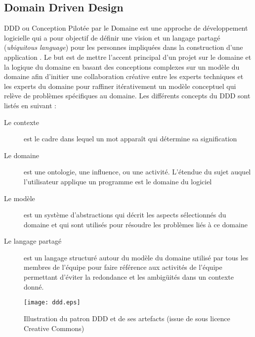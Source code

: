 \subsection{Domain Driven Design}
	
	\gls{DDD} ou Conception Pilotée par le Domaine est une 
	approche de 
	développement logicielle qui a pour objectif de définir une vision et un 
	langage partagé (\textit{ubiquitous language}) pour les personnes 
	impliquées dans la construction d'une application \cite{Evans2003}.
	Le but est de mettre l'accent principal d'un projet sur le domaine et la logique du 
	domaine en basant des conceptions complexes sur un modèle du domaine afin 
	d'initier une collaboration créative entre les experts techniques et les experts du 
	domaine pour raffiner itérativement un modèle conceptuel qui relève de 
	problèmes spécifiques au domaine.
	Les différents concepts du \gls{DDD} sont listés en suivant :
	\begin{description}
		\item[Le contexte] est le cadre dans lequel un mot apparaît qui détermine sa 
		signification
		\item[Le domaine] est une ontologie, une influence, ou une activité. 
		L'étendue du sujet auquel l'utilisateur applique un programme est le domaine 
		du logiciel 
		\item[Le modèle] est un système d'abstractions qui décrit les aspects 
		sélectionnés du domaine et qui sont utilisés pour résoudre les problèmes liés 
		à ce domaine
		\item[Le langage partagé] est un langage structuré autour du modèle du 
		domaine utilisé par tous les membres de l'équipe pour faire référence aux 
		activités de l'équipe permettant d'éviter la redondance et les ambigüités dans 
		un contexte donné.
	\end{description}

\begin{figure}
	\noindent
	\centering
	\texttt{[image: ddd.eps]}
	\caption[Illustration du patron \gls{DDD} et de ses artefacts]{Illustration du 
	patron \gls{DDD} et de ses artefacts (issue de 
	\cite{Avram2006} sous licence Creative Commons)}
\label{fig:ddd}
\end{figure}

